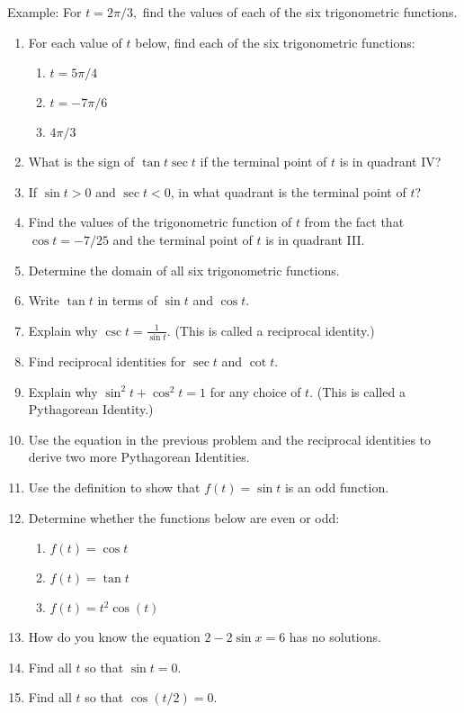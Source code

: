 \documentclass[11pt]{article}
\begin{document}
Example: For $t=2\pi/3,$ find the values of each of the six trigonometric functions.
\newpage
\begin{enumerate}\item For each value of $t$ below, find each of the six trigonometric functions:
\begin{enumerate}
\item $t=5 \pi/4$\\
\vfill
\item $t=-7\pi/6$\\
\vfill
\item $4\pi/3$\\
\vfill
\end{enumerate}
\item What is the sign of $\tan t \sec t$ if the terminal point of $t$ is in quadrant IV?
\vfill
\item If $\sin t > 0$ and $\sec t < 0$, in what quadrant is the terminal point of $t$?
\vfill
\item Find the values of the trigonometric function of $t$ from the fact that $\cos t = -7/25$ and the terminal point of $t$ is in quadrant III.
\vfill
\item Determine the domain of all six trigonometric functions.
\vfill
\newpage
\item Write $\tan t$ in terms of $\sin t$ and $\cos t.$
\vfill
\item Explain why $\csc t = \frac{1}{\sin t}.$ (This is called a reciprocal identity.)
\vfill
\item Find reciprocal identities for $\sec t$ and $\cot t.$
\vfill
\item Explain why $\sin^2 t + \cos^2 t = 1$ for any choice of $t.$ (This is called a Pythagorean Identity.)
\vfill
\item Use the equation in the previous problem and the reciprocal identities to derive two more Pythagorean Identities.
\vfill
\item Use the definition to show  that $f(t)=\sin t$ is an odd function.
\vfill
\newpage
\item Determine whether the functions below are even or odd:
\begin{enumerate}
\item $f(t)=\cos t$
\vfill
\item $f(t)=\tan t$
\vfill
\item $f(t)=t^2\cos(t)$
\vfill
\end{enumerate}
\item How do you know the equation $2-2\sin x=6$ has no solutions.
\vfill
\item Find all $t$ so that $\sin t =0.$
\vfill
\item Find all $t$ so that $\cos (t/2)=0.$
\vfill
\end{enumerate}
\end{document}

